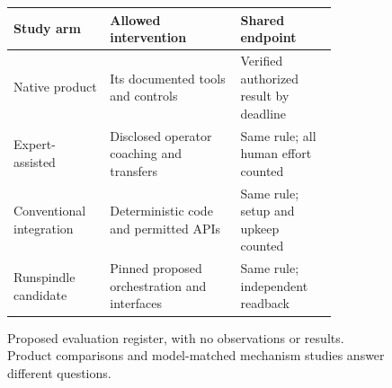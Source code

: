 \begin{figure}[htbp]
\centering\small
\begin{tabular}{|p{0.24\linewidth}|p{0.35\linewidth}|p{0.26\linewidth}|}
\hline
\textbf{Study arm} & \textbf{Allowed intervention} & \textbf{Shared endpoint} \\
\hline
Native product & Its documented tools and controls & Verified authorized result by deadline \\
\hline
Expert-assisted & Disclosed operator coaching and transfers & Same rule; all human effort counted \\
\hline
Conventional integration & Deterministic code and permitted APIs & Same rule; setup and upkeep counted \\
\hline
Runspindle candidate & Pinned proposed orchestration and interfaces & Same rule; independent readback \\
\hline
\end{tabular}
\caption{Proposed evaluation register, with no observations or results. Product comparisons and model-matched mechanism studies answer different questions.}
\label{fig:evaluation-register}
\end{figure}
